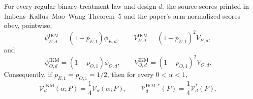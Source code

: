 For every regular binary-treatment law and design \(d\), the source scores printed in Imbens--Kallus--Mao--Wang Theorem~5 and the paper's arm-normalized scores obey, pointwise,
\[
 \psi_{E,d}^{\mathrm{IKM}}=(1-p_{E,1})\phi_{E,d},
 \qquad
 V_{E,d}^{\mathrm{IKM}}=(1-p_{E,1})^2V_{E,d},
\]
and
\[
 \psi_{O,d}^{\mathrm{IKM}}=(1-p_{O,1})\phi_{O,d},
 \qquad
 V_{O,d}^{\mathrm{IKM}}=(1-p_{O,1})^2V_{O,d}.
\]
Consequently, if \(p_{E,1}=p_{O,1}=1/2\), then for every \(0<\alpha<1\),
\[
 \mathcal V_d^{\mathrm{IKM}}(\alpha;P)=\frac14\mathcal V_d(\alpha;P),
 \qquad
 \mathcal V_d^{\mathrm{IKM},*}(P)=\frac14\mathcal V_d^*(P).
\]